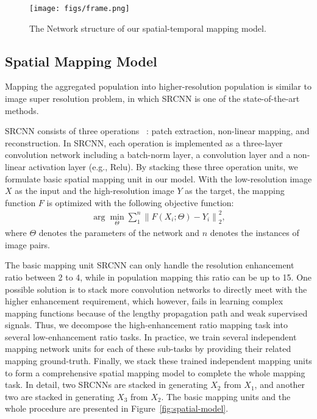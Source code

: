 \documentclass[letterpaper]{article} %
\begin{document}
\begin{figure}[ht]
    \centering
    \texttt{[image: figs/frame.png]}
    \caption{The Network structure of our spatial-temporal mapping model.}
    \label{fig:model}
\end{figure}

\subsection{Spatial Mapping Model}
Mapping the aggregated population into higher-resolution population is similar to image super resolution problem, in which SRCNN is one of the state-of-the-art methods.

SRCNN consists of three operations ~\cite{Dong2016ImageSU}: patch extraction, non-linear mapping, and reconstruction. In SRCNN, each operation is implemented as a three-layer convolution network including a batch-norm layer, a convolution layer and a non-linear activation layer (e.g., Relu). By stacking these three operation units, we formulate basic spatial mapping unit in our model. With the low-resolution image $X$ as the input and the high-resolution image $Y$ as the target, the mapping function $F$ is optimized with the following objective function:
\begin{gather}
    \arg\mathop{\min}_{\Theta}\sum^n_1{{\lVert F(X_i;\Theta) -Y_i \rVert}_2^2},
\end{gather}
where $\Theta$ denotes the parameters of the network and $n$ denotes the instances of image pairs. 


The basic mapping unit SRCNN can only handle the resolution enhancement ratio between 2 to 4, while in population mapping this ratio can be up to 15. One possible solution is to stack more convolution networks to directly meet with the higher enhancement requirement, which however, fails in learning complex mapping functions because of the lengthy propagation path and weak supervised signals. Thus, we decompose the high-enhancement ratio mapping task into several low-enhancement ratio tasks. In practice, we train several independent mapping network units for each of these sub-tasks by providing their related mapping ground-truth. Finally, we stack these trained independent mapping units to form a comprehensive spatial mapping model to complete the whole mapping task. In detail, two SRCNNs are stacked in generating $X_2$ from $X_1$, and another two are stacked in generating $X_3$ from $X_2$. The basic mapping units and the whole procedure are presented in Figure~\ref{fig:spatial-model}.
\end{document}
